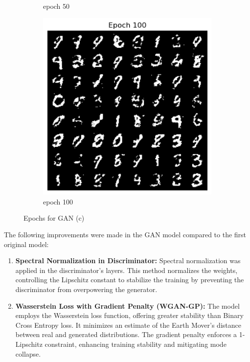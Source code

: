 \documentclass[a4paper]{article}
\theoremstyle{definition}
\newenvironment{soln}{
	\leavevmode\color{blue}\ignorespaces
}{}
\begin{document}
\begin{enumerate} [label=(\alph*)]
\begin{soln}
\begin{figure}[H]
\begin{subfigure}[b]{0.3\textwidth}
					\caption{epoch 50}
				\end{subfigure}
				\hfill
				\begin{subfigure}[b]{0.3\textwidth}
					\centering
					\includegraphics[width=\textwidth]{3-Epoch100.png}
					\caption{epoch 100}
				\end{subfigure}
				\caption{Epochs for GAN (c)}
				\label{epochs_3}
			\end{figure}

			The following improvements were made in the GAN model compared to the first original model:

			\begin{enumerate}
				\item \textbf{Spectral Normalization in Discriminator:} Spectral normalization was applied in the discriminator's layers. This method normalizes the weights, controlling the Lipschitz constant to stabilize the training by preventing the discriminator from overpowering the generator.
			
				\item \textbf{Wasserstein Loss with Gradient Penalty (WGAN-GP):} The model employs the Wasserstein loss function, offering greater stability than Binary Cross Entropy loss. It minimizes an estimate of the Earth Mover's distance between real and generated distributions. The gradient penalty enforces a 1-Lipschitz constraint, enhancing training stability and mitigating mode collapse.
			

\end{enumerate}
\end{soln}
\end{enumerate}
\end{document}
